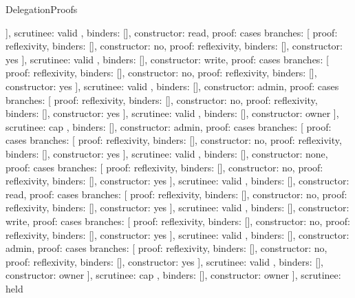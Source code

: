 \begin{lexlean}{DelegationProofs}
\begin{semanticmodule}
{{{{{{            ],
            scrutinee: valid
          }, binders: [], constructor: read},
          {proof: cases{
            branches: [
              {proof: reflexivity{}, binders: [], constructor: no},
              {proof: reflexivity{}, binders: [], constructor: yes}
            ],
            scrutinee: valid
          }, binders: [], constructor: write},
          {proof: cases{
            branches: [
              {proof: reflexivity{}, binders: [], constructor: no},
              {proof: reflexivity{}, binders: [], constructor: yes}
            ],
            scrutinee: valid
          }, binders: [], constructor: admin},
          {proof: cases{
            branches: [
              {proof: reflexivity{}, binders: [], constructor: no},
              {proof: reflexivity{}, binders: [], constructor: yes}
            ],
            scrutinee: valid
          }, binders: [], constructor: owner}
        ],
        scrutinee: cap
      }, binders: [], constructor: admin},
      {proof: cases{
        branches: [
          {proof: cases{
            branches: [
              {proof: reflexivity{}, binders: [], constructor: no},
              {proof: reflexivity{}, binders: [], constructor: yes}
            ],
            scrutinee: valid
          }, binders: [], constructor: none},
          {proof: cases{
            branches: [
              {proof: reflexivity{}, binders: [], constructor: no},
              {proof: reflexivity{}, binders: [], constructor: yes}
            ],
            scrutinee: valid
          }, binders: [], constructor: read},
          {proof: cases{
            branches: [
              {proof: reflexivity{}, binders: [], constructor: no},
              {proof: reflexivity{}, binders: [], constructor: yes}
            ],
            scrutinee: valid
          }, binders: [], constructor: write},
          {proof: cases{
            branches: [
              {proof: reflexivity{}, binders: [], constructor: no},
              {proof: reflexivity{}, binders: [], constructor: yes}
            ],
            scrutinee: valid
          }, binders: [], constructor: admin},
          {proof: cases{
            branches: [
              {proof: reflexivity{}, binders: [], constructor: no},
              {proof: reflexivity{}, binders: [], constructor: yes}
            ],
            scrutinee: valid
          }, binders: [], constructor: owner}
        ],
        scrutinee: cap
      }, binders: [], constructor: owner}
    ],
    scrutinee: held
  }
}


\end{semanticmodule}
\end{lexlean}
